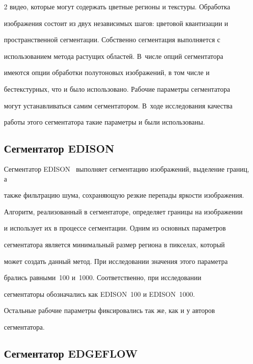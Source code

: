 \begin{multicols}{2}
видео, которые могут содержать цветные регионы и текстуры. Обработка 


изображения состоит из двух независимых шагов: цветовой квантизации и 


пространственной сегментации. Собственно сегментация выполняется с 


использованием метода растущих областей. В~чис\-ле опций сегментатора 


имеются опции обработки полутоновых изображений, в том числе и 


бестекстурных, что и было использовано. Рабочие параметры сегментатора 


могут устанавливаться самим сегментатором. В~ходе исследования качества 


работы этого сегментатора такие па\-ра\-мет\-ры и были использованы.


  


  \subsection{Сегментатор EDISON} %


  


  Сегментатор EDISON~\cite{10-kol} выполняет сегментацию изображений, выделение границ, а 


также фильтрацию шума, сохраняющую резкие перепады яркости изоб\-ра\-же\-ния. 


Алгоритм, реализованный в сегментаторе, определяет границы на изображении 


и использует их в процессе сегментации. Одним из основных параметров 


сегментатора является минимальный размер региона в пикселах, который 


может создать данный метод. При исследовании значения этого параметра 


брались равными~100 и~1000. Соответственно, при исследовании 


сегментаторы обозначались как {EDISON~100} и {EDISON~1000}. 


Остальные рабочие параметры фиксировались так же, как и у авторов 


сегментатора.


  


  \subsection{Сегментатор EDGEFLOW} %



\end{multicols}
